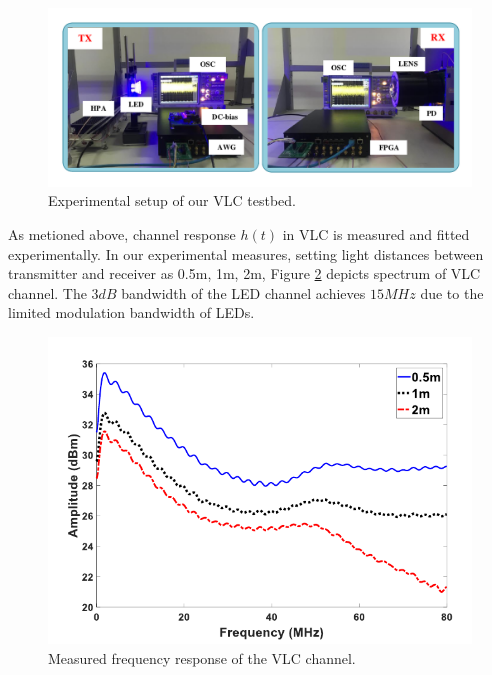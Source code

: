 \documentclass[9pt,twocolumn,twoside]{osajnl}
\begin{document}
\begin{figure}[tb]
  \centering
  \includegraphics[width=\linewidth]{figures/Experiment.pdf}
  \caption{Experimental setup of our VLC testbed.}
  \label{fig:experiment}
\end{figure}

As metioned above, channel response $h(t)$ in VLC is measured and fitted 
experimentally. In our experimental measures, 
setting light distances between transmitter and receiver as 0.5m, 1m, 2m, Figure \ref{fig:channel} depicts 
spectrum of VLC channel. The $3dB$ bandwidth of the LED channel achieves $15MHz$ due to the limited modulation bandwidth of LEDs.

\begin{figure}[tb]
  \centering
  \includegraphics[width=\linewidth]{figures/ChannelSpec.pdf}
  \caption{Measured frequency response of the VLC channel.}
  \label{fig:channel}
  \end{figure}
\end{document}
